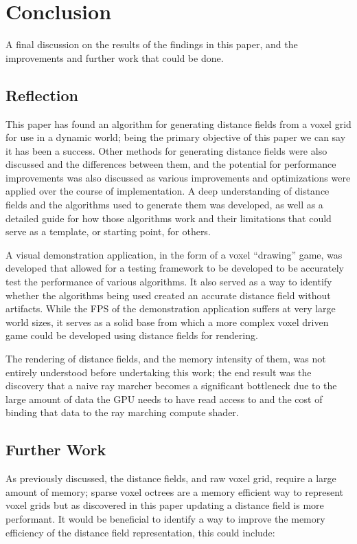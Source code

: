 \chapter{Conclusion}
A final discussion on the results of the findings in this paper, and the improvements and further work that could be
done.

\section{Reflection}
This paper has found an algorithm for generating distance fields from a voxel grid for use in a dynamic world; being
the primary objective of this paper we can say it has been a success. Other methods for generating distance fields
were also discussed and the differences between them, and the potential for performance improvements was also discussed
as various improvements and optimizations were applied over the course of implementation. A deep understanding of
distance fields and the algorithms used to generate them was developed, as well as a detailed guide for how those
algorithms work and their limitations that could serve as a template, or starting point, for others.

A visual demonstration application, in the form of a voxel ``drawing'' game, was developed that allowed for a
testing framework to be developed to be accurately test the performance of various algorithms. It also served as a way
to identify whether the algorithms being used created an accurate distance field without artifacts. While the FPS of
the demonstration application suffers at very large world sizes, it serves as a solid base from which a more complex
voxel driven game could be developed using distance fields for rendering.

The rendering of distance fields, and the memory intensity of them, was not entirely understood before undertaking this
work; the end result was the discovery that a naive ray marcher becomes a significant bottleneck due to the large amount
of data the GPU needs to have read access to and the cost of binding that data to the ray marching compute shader.

\section{Further Work}
As previously discussed, the distance fields, and raw voxel grid, require a large amount of memory; sparse voxel octrees
are a memory efficient way to represent voxel grids but as discovered in this paper updating a distance field is more
performant. It would be beneficial to identify a way to improve the memory efficiency of the distance field
representation, this could include:

